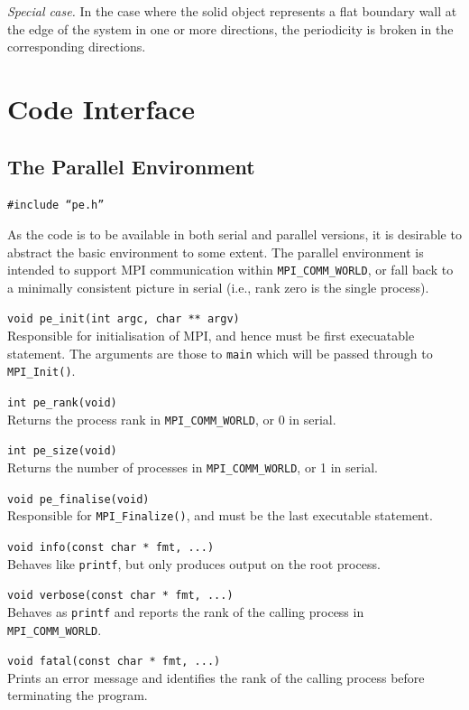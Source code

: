 \textit{Special case.} In the case where the solid object
represents a flat boundary wall at the edge of the system
in one or more directions, the periodicity is broken in
the corresponding directions.


\vfill
\pagebreak

\section{Code Interface}

\subsection{The Parallel Environment}

\texttt{\#include ``pe.h''}

As the code is to be available in both serial and parallel versions,
it is desirable to abstract the basic environment to some extent.
The parallel environment is intended to support MPI communication
within \texttt{MPI\_COMM\_WORLD}, or fall back to a minimally
consistent picture in serial (i.e., rank zero is the single process).

\texttt{void pe\_init(int argc, char ** argv)}\\
Responsible for initialisation of MPI, and hence must be first
execuatable statement. The arguments are those to \texttt{main}
which will be passed through to \texttt{MPI\_Init()}.

\texttt{int pe\_rank(void)}\\
Returns the process rank in \texttt{MPI\_COMM\_WORLD}, or 0 in
serial.

\texttt{int pe\_size(void)}\\
Returns the number of processes in \texttt{MPI\_COMM\_WORLD}, or
1 in serial.

\texttt{void pe\_finalise(void)}\\
Responsible for \texttt{MPI\_Finalize()}, and must be the last
executable statement.

\texttt{void info(const char * fmt, ...)}\\
Behaves like \texttt{printf}, but only produces output on the
root process.

\texttt{void verbose(const char * fmt, ...)}\\
Behaves as \texttt{printf} and reports the rank of the
calling process in \texttt{MPI\_COMM\_WORLD}.

\texttt{void fatal(const char * fmt, ...)}\\
Prints an error message and identifies
the rank of the calling process before terminating the program.


